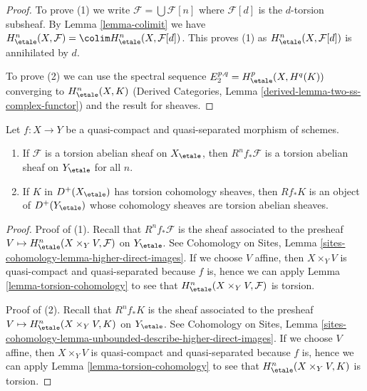 \begin{proof}
To prove (1) we write $\mathcal{F} = \bigcup \mathcal{F}[n]$ where
$\mathcal{F}[d]$ is the $d$-torsion subsheaf. By
Lemma \ref{lemma-colimit} we have
$H^n_\etale(X, \mathcal{F}) = \colim H^n_\etale(X, \mathcal{F}[d])$.
This proves (1) as $H^n_\etale(X, \mathcal{F}[d])$ is annihilated by $d$.

\medskip\noindent
To prove (2) we can use the spectral sequence
$E_2^{p, q} = H^p_\etale(X, H^q(K))$ converging to $H^n_\etale(X, K)$
(Derived Categories, Lemma \ref{derived-lemma-two-ss-complex-functor})
and the result for sheaves.
\end{proof}

\begin{lemma}
\label{lemma-torsion-direct-image}
Let $f : X \to Y$ be a quasi-compact and quasi-separated
morphism of schemes.
\begin{enumerate}
\item If $\mathcal{F}$ is a torsion abelian sheaf on $X_\etale$, then
$R^nf_*\mathcal{F}$ is a torsion abelian sheaf on $Y_\etale$ for all $n$.
\item If $K$ in $D^+(X_\etale)$ has torsion cohomology sheaves, then
$Rf_*K$ is an object of $D^+(Y_\etale)$ whose cohomology sheaves are
torsion abelian sheaves.
\end{enumerate}
\end{lemma}

\begin{proof}
Proof of (1). Recall that $R^nf_*\mathcal{F}$ is the sheaf associated
to the presheaf $V \mapsto H^n_\etale(X \times_Y V, \mathcal{F})$
on $Y_\etale$. See Cohomology on Sites,
Lemma \ref{sites-cohomology-lemma-higher-direct-images}.
If we choose $V$ affine, then $X \times_Y V$ is
quasi-compact and quasi-separated because $f$ is, hence
we can apply Lemma \ref{lemma-torsion-cohomology} to see that
$H^n_\etale(X \times_Y V, \mathcal{F})$ is torsion.

\medskip\noindent
Proof of (2). Recall that $R^nf_*K$ is the sheaf associated
to the presheaf $V \mapsto H^n_\etale(X \times_Y V, K)$
on $Y_\etale$. See Cohomology on Sites,
Lemma \ref{sites-cohomology-lemma-unbounded-describe-higher-direct-images}.
If we choose $V$ affine, then $X \times_Y V$ is
quasi-compact and quasi-separated because $f$ is, hence
we can apply Lemma \ref{lemma-torsion-cohomology} to see that
$H^n_\etale(X \times_Y V, K)$ is torsion.
\end{proof}









